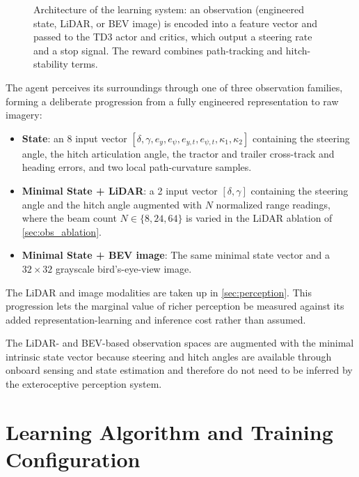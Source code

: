 \begin{figure}[H]
    \centering
    \resizebox{\textwidth}{!}{}
    \caption{Architecture of the learning system: an observation (engineered state, LiDAR, or BEV image) is encoded into a feature vector and passed to the TD3 actor and critics, which output a steering rate and a stop signal. The reward combines path-tracking and hitch-stability terms.}
    \label{fig:learning_framework}
\end{figure}

The agent perceives its surroundings through one of three observation families, forming a deliberate progression from a fully engineered representation to raw imagery:
\begin{itemize}
    \item \textbf{State}: an 8 input vector $[\delta,\gamma,e_y,e_\psi,e_{y,t},e_{\psi,t},\kappa_1,\kappa_2]$ containing the steering angle, the hitch articulation angle, the tractor and trailer cross-track and heading errors, and two local path-curvature samples.
    \item \textbf{Minimal State + LiDAR}: a 2 input vector $[\delta,\gamma]$  containing the steering angle and the hitch angle augmented with $N$ normalized range readings, where the beam count $N \in \{8,24,64\}$ is varied in the LiDAR ablation of \cref{sec:obs_ablation}.
    \item \textbf{Minimal State + BEV image}: The same minimal state vector and a $32 \times 32$ grayscale bird's-eye-view image.
\end{itemize}
The LiDAR and image modalities are taken up in \cref{sec:perception}. This progression lets the marginal value of richer perception be measured against its added representation-learning and inference cost rather than assumed.

The LiDAR- and BEV-based observation spaces are augmented with the minimal intrinsic state vector because steering and hitch angles are available through onboard sensing and state estimation and therefore do not need to be inferred by the exteroceptive perception system.

\section{Learning Algorithm and Training Configuration}

